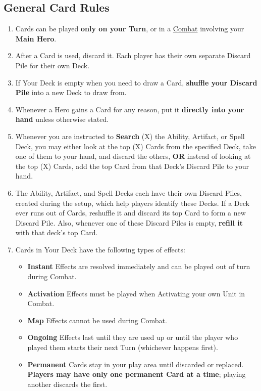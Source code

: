 \begin{multicols*}{2}
\subsection*{General Card Rules}
\begin{enumerate}
  \item Cards can be played \textbf{only on your Turn}, or in a \hyperlink{Combat}{Combat} involving your \textbf{Main Hero}.
  \item After a Card is used, discard it.
    Each player has their own separate Discard Pile for their own Deck.
  \item If Your Deck is empty when you need to draw a Card, \textbf{shuffle your Discard Pile} into a new Deck to draw from.
  \item Whenever a Hero gains a Card for any reason, put it \textbf{directly into your hand} unless otherwise stated.
  \item Whenever you are instructed to \textbf{Search} (X) the Ability, Artifact, or Spell Deck, you may either look at the top (X) Cards from the specified Deck, take one of them to your hand, and discard the others, \textbf{OR} instead of looking at the top (X) Cards, add the top Card from that Deck's Discard Pile to your hand.
  \item The Ability, Artifact, and Spell Decks each have their own Discard Piles, created during the setup, which help players identify these Decks.
    If a Deck ever runs out of Cards, reshuffle it and discard its top Card to form a new Discard Pile.
    Also, whenever one of these Discard Piles is empty, \textbf{refill it} with that deck's top Card.
  \item Cards in Your Deck have the following types of effects:
  \begin{itemize}
        \item \textbf{Instant}  Effects are resolved immediately and can be played out of turn during Combat.
        \item \textbf{Activation}  Effects must be played when Activating your own Unit in Combat.
        \item \textbf{Map}  Effects cannot be used during Combat.
        \item \textbf{Ongoing}  Effects last until they are used up or until the player who played them starts their next Turn (whichever happens first).
        \item \textbf{Permanent}  Cards stay in your play area until discarded or replaced.
          \textbf{Players may have only one permanent Card at a time}; playing another discards the first.
    \end{itemize}
\end{enumerate}


\end{multicols*}
